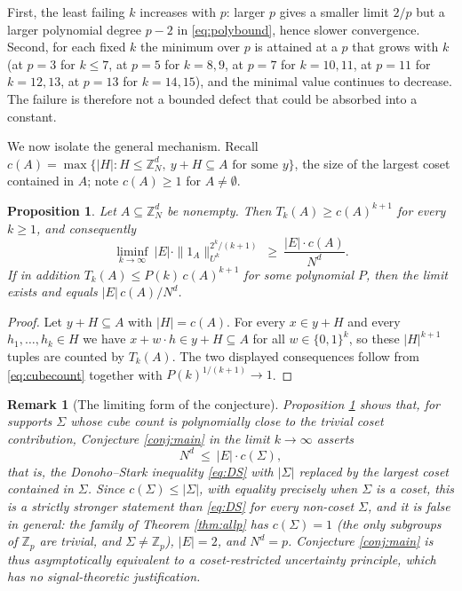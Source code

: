 \documentclass[12pt]{amsart}
\newcommand{\Z}{\mathbb{Z}}
\newtheorem{proposition}[theorem]{Proposition}
\newtheorem{remark}[theorem]{Remark}
\begin{document}
First, the least failing $k$ increases with $p$: larger $p$ gives a smaller limit $2/p$ but a larger polynomial degree $p-2$ in \eqref{eq:polybound}, hence slower convergence. Second, for each fixed $k$ the minimum over $p$ is attained at a $p$ that grows with $k$ (at $p=3$ for $k\le7$, at $p=5$ for $k=8,9$, at $p=7$ for $k=10,11$, at $p=11$ for $k=12,13$, at $p=13$ for $k=14,15$), and the minimal value continues to decrease. The failure is therefore not a bounded defect that could be absorbed into a constant.

We now isolate the general mechanism. Recall $c(A)=\max\{|H|:H\le\Z_N^d,\ y+H\subseteq A\text{ for some }y\}$, the size of the largest coset contained in $A$; note $c(A)\ge1$ for $A\ne\emptyset$.

\begin{proposition}\label{prop:mechanism}
Let $A\subseteq\Z_N^d$ be nonempty. Then $T_k(A)\ge c(A)^{k+1}$ for every $k\ge1$, and consequently
\[
\liminf_{k\to\infty}\ |E|\cdot\|1_A\|_{U^k}^{2^k/(k+1)}\ \ge\ \frac{|E|\cdot c(A)}{N^d}.
\]
If in addition $T_k(A)\le P(k)\,c(A)^{k+1}$ for some polynomial $P$, then the limit exists and equals $|E|\,c(A)/N^d$.
\end{proposition}

\begin{proof}
Let $y+H\subseteq A$ with $|H|=c(A)$. For every $x\in y+H$ and every $h_1,\dots,h_k\in H$ we have $x+w\cdot h\in y+H\subseteq A$ for all $w\in\{0,1\}^k$, so these $|H|^{k+1}$ tuples are counted by $T_k(A)$. The two displayed consequences follow from \eqref{eq:cubecount} together with $P(k)^{1/(k+1)}\to1$.
\end{proof}

\begin{remark}[The limiting form of the conjecture]\label{rem:limitform}
Proposition \ref{prop:mechanism} shows that, for supports $\Sigma$ whose cube count is polynomially close to the trivial coset contribution, Conjecture \ref{conj:main} in the limit $k\to\infty$ asserts
\[
N^d\ \le\ |E|\cdot c(\Sigma),
\]
that is, the Donoho--Stark inequality \eqref{eq:DS} with $|\Sigma|$ replaced by the largest coset contained in $\Sigma$. Since $c(\Sigma)\le|\Sigma|$, with equality precisely when $\Sigma$ is a coset, this is a strictly stronger statement than \eqref{eq:DS} for every non-coset $\Sigma$, and it is false in general: the family of Theorem \ref{thm:allp} has $c(\Sigma)=1$ (the only subgroups of $\Z_p$ are trivial, and $\Sigma\ne\Z_p$), $|E|=2$, and $N^d=p$. Conjecture \ref{conj:main} is thus asymptotically equivalent to a coset-restricted uncertainty principle, which has no signal-theoretic justification.
\end{remark}
\end{document}
